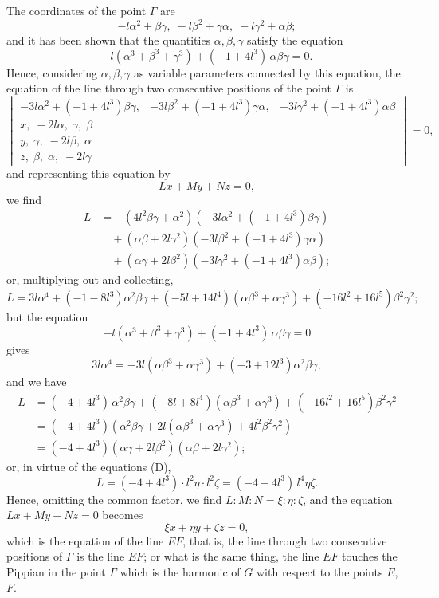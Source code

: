 \documentclass[11pt]{article}
\begin{document}
The coordinates of the point $\Gamma$ are
\[
-l\alpha^2 + \beta\gamma,\; -l\beta^2 + \gamma\alpha,\; -l\gamma^2 + \alpha\beta;
\]
and it has been shown that the quantities $\alpha, \beta, \gamma$ satisfy the equation
\[
-l(\alpha^3 + \beta^3 + \gamma^3) + (-1 + 4 l^3)\,\alpha\beta\gamma = 0.
\]
Hence, considering $\alpha, \beta, \gamma$ as variable parameters connected by this equation, the equation of the line through two consecutive positions of the point $\Gamma$ is
\[
\begin{vmatrix}
-3 l \alpha^2 + (-1 + 4 l^3)\beta\gamma, & -3 l \beta^2 + (-1 + 4 l^3)\gamma\alpha, & -3 l \gamma^2 + (-1 + 4 l^3)\alpha\beta \\
x,\; -2 l \alpha,\; \gamma,\; \beta \\
y,\; \gamma,\; -2 l \beta,\; \alpha \\
z,\; \beta,\; \alpha,\; -2 l \gamma
\end{vmatrix} = 0,
\]
and representing this equation by
\[
L x + M y + N z = 0,
\]
we find
\begin{align*}
L &= -(4 l^2 \beta\gamma + \alpha^2)(-3 l \alpha^2 + (-1 + 4 l^3)\beta\gamma) \\
&\quad + (\alpha\beta + 2 l \gamma^2)(-3 l \beta^2 + (-1 + 4 l^3)\gamma\alpha) \\
&\quad + (\alpha\gamma + 2 l \beta^2)(-3 l \gamma^2 + (-1 + 4 l^3)\alpha\beta);
\end{align*}
or, multiplying out and collecting,
\[
L = 3 l \alpha^4 + (-1 - 8 l^3) \alpha^2 \beta\gamma + (-5 l + 14 l^4)(\alpha\beta^3 + \alpha\gamma^3) + (-16 l^2 + 16 l^5)\beta^2 \gamma^2;
\]
but the equation
\[
-l(\alpha^3 + \beta^3 + \gamma^3) + (-1 + 4 l^3)\,\alpha\beta\gamma = 0
\]
gives
\[
3 l \alpha^4 = -3 l (\alpha\beta^3 + \alpha\gamma^3) + (-3 + 12 l^3)\alpha^2 \beta\gamma,
\]
and we have
\begin{align*}
L &= (-4 + 4 l^3)\,\alpha^2\beta\gamma + (-8 l + 8 l^4)(\alpha\beta^3 + \alpha\gamma^3) + (-16 l^2 + 16 l^5)\beta^2\gamma^2 \\
  &= (-4 + 4 l^3)(\alpha^2\beta\gamma + 2 l (\alpha\beta^3 + \alpha\gamma^3) + 4 l^2 \beta^2\gamma^2) \\
  &= (-4 + 4 l^3)(\alpha\gamma + 2 l\beta^2)(\alpha\beta + 2 l \gamma^2);
\end{align*}
or, in virtue of the equations (D),
\[
L = (-4 + 4 l^3)\cdot l^2 \eta \cdot l^2 \zeta = (-4 + 4 l^3)\, l^4 \eta\zeta.
\]
Hence, omitting the common factor, we find $L : M : N = \xi : \eta : \zeta$, and the equation $L x + M y + N z = 0$ becomes
\[
\xi x + \eta y + \zeta z = 0,
\]
which is the equation of the line $EF$, that is, the line through two consecutive positions of $\Gamma$ is the line $EF$; or what is the same thing, the line $EF$ touches the Pippian in the point $\Gamma$ which is the harmonic of $G$ with respect to the points $E$, $F$.
\end{document}
